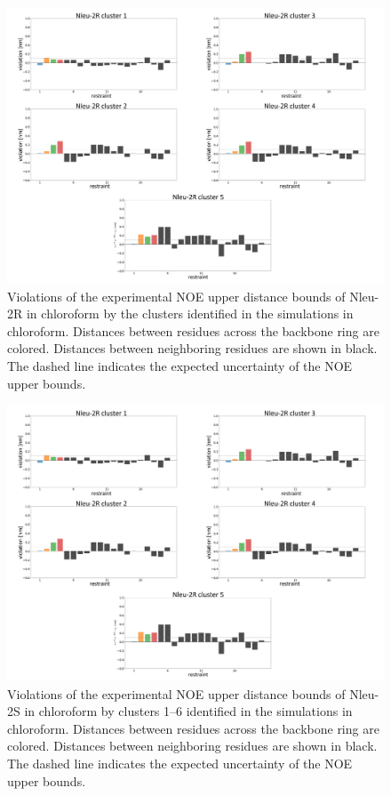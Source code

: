 \begin{figure}
    \centering
    \includegraphics[width=\textwidth]{7_chapter_5/fig/results/NMR_2R.png}
    \caption{Violations  of  the  experimental  NOE  upper  distance  bounds  of  Nleu-2R  in chloroform by the clusters identified in the simulations in chloroform. Distances              between residues across the backbone ring are colored. Distances between neighboring residues are shown in black. The dashed line indicates the expected uncertainty of          the NOE upper bounds.}
    \label{fig: SINOE violations Nleu-2R}
\end{figure}

\begin{figure}
    \centering
    \includegraphics[width=\textwidth]{7_chapter_5/fig/results/NMR_2R.png}
    \caption{Violations  of  the  experimental  NOE  upper  distance  bounds  of  Nleu-2S  in chloroform by clusters 1–6 identified in the simulations in chloroform. Distances              between residues across the backbone ring are colored. Distances between neighboring residues are shown in black. The dashed line indicates the expected uncertainty of          the NOE upper bounds.}
    \label{fig: SINOE violations Nleu-2S}
\end{figure}

